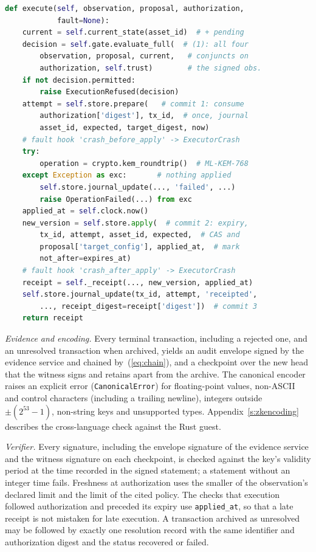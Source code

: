 \documentclass[journal]{IEEEtran}
\newcommand{\code}[1]{\texttt{\footnotesize #1}}
\begin{document}
\begin{lstlisting}[float=tp,language=Python,basicstyle=\ttfamily\scriptsize,captionpos=b,caption={Execution path of the reference implementation, abridged from \texttt{abd/roles.py}. \texttt{asset\_id} and \texttt{tx\_id} come from the proposal; \texttt{expected}, \texttt{target\_digest} and \texttt{expires\_at} from the authorization; \texttt{now} from the clock.},label={lst:gate}]
def execute(self, observation, proposal, authorization,
            fault=None):
    current = self.current_state(asset_id)  # + pending
    decision = self.gate.evaluate_full(  # (1): all four
        observation, proposal, current,   # conjuncts on
        authorization, self.trust)        # the signed obs.
    if not decision.permitted:
        raise ExecutionRefused(decision)
    attempt = self.store.prepare(   # commit 1: consume
        authorization['digest'], tx_id,  # once, journal
        asset_id, expected, target_digest, now)
    # fault hook 'crash_before_apply' -> ExecutorCrash
    try:
        operation = crypto.kem_roundtrip()  # ML-KEM-768
    except Exception as exc:       # nothing applied
        self.store.journal_update(..., 'failed', ...)
        raise OperationFailed(...) from exc
    applied_at = self.clock.now()
    new_version = self.store.apply(  # commit 2: expiry,
        tx_id, attempt, asset_id, expected,  # CAS and
        proposal['target_config'], applied_at,  # mark
        not_after=expires_at)
    # fault hook 'crash_after_apply' -> ExecutorCrash
    receipt = self._receipt(..., new_version, applied_at)
    self.store.journal_update(tx_id, attempt, 'receipted',
        ..., receipt_digest=receipt['digest'])  # commit 3
    return receipt
\end{lstlisting}

\emph{Evidence and encoding.} Every terminal transaction, including a rejected one, and an unresolved transaction when archived, yields an audit envelope signed by the evidence service and chained by~(\ref{eq:chain}), and a checkpoint over the new head that the witness signs and retains apart from the archive. The canonical encoder raises an explicit error (\code{CanonicalError}) for floating-point values, non-ASCII and control characters (including a trailing newline), integers outside $\pm(2^{53}-1)$, non-string keys and unsupported types. Appendix~\ref{s:zkencoding} describes the cross-language check against the Rust guest.

\emph{Verifier.} Every signature, including the envelope signature of the evidence service and the witness signature on each checkpoint, is checked against the key's validity period at the time recorded in the signed statement; a statement without an integer time fails. Freshness at authorization uses the smaller of the observation's declared limit and the limit of the cited policy. The checks that execution followed authorization and preceded its expiry use \code{applied\_at}, so that a late receipt is not mistaken for late execution. A transaction archived as unresolved may be followed by exactly one resolution record with the same identifier and authorization digest and the status recovered or failed.
\end{document}
